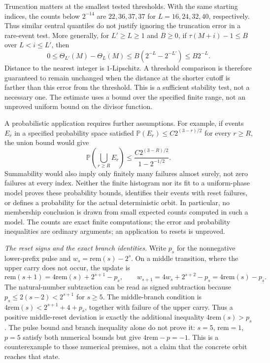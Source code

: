 Truncation matters at the smallest tested thresholds.  With the
same starting indices, the counts below $2^{-14}$ are $22,36,37,37$
for $L=16,24,32,40$, respectively.  Thus similar central quantiles
do not justify ignoring the truncation error in a rare-event test.
More generally, for $L'\ge L\ge1$ and $B\ge0$, if
$\tau(M+i)-1\le B$ over $L<i\le L'$, then
\[
 0\le\Theta_{L'}(M)-\Theta_L(M)
 \le B(2^{-L}-2^{-L'})\le B2^{-L}.
\]
Distance to the nearest integer is $1$-Lipschitz.  A threshold
comparison is therefore guaranteed to remain unchanged when
the distance at the shorter cutoff is farther than this error
from the threshold.  This is a sufficient stability test, not a
necessary one.
The estimate uses a bound over the specified finite range, not an
unproved uniform bound on the divisor function.

A probabilistic application requires further assumptions.  For
example, if events $E_r$ in a specified probability space satisfied
$\mathbb P(E_r)\le C2^{(3-r)/2}$ for every $r\ge R$, the union
bound would give
\[
 \mathbb P\left(\bigcup_{r\ge R}E_r\right)
 \le \frac{C2^{(3-R)/2}}{1-2^{-1/2}}.
\]
Summability would also imply only finitely many failures almost
surely, not zero failures at every index.  Neither the finite
histogram nor its fit to a uniform-phase model proves these
probability bounds, identifies their events with reset failures,
or defines a probability for the actual deterministic orbit.
In particular, no membership conclusion is drawn from small
expected counts computed in such a model.  The counts are
exact finite computations; the error and probability inequalities are
ordinary arguments; an application to resets is unproved.

\emph{The reset signs and the exact branch identities.}
Write $p_s$ for the nonnegative lower-prefix pulse and
$w_s=\mathrm{rem}(s)-2^s$.  On a middle transition, where the upper
carry does not occur, the update is
\[
 \mathrm{rem}(s+1)=4\mathrm{rem}(s)+2^{s+1}-p_s,
 \qquad
 w_{s+1}=4w_s+2^{s+2}-p_s=4\mathrm{rem}(s)-p_s.
\]
The natural-number subtraction can be read as signed subtraction
because $p_s\le2(s-2)<2^{s+1}$ for $s\ge5$.
The middle-branch condition is
$4\mathrm{rem}(s)<2^{s+1}+4+p_s$, together with failure of the
upper carry.  Thus a positive middle-reset deviation is exactly the
additional inequality $4\mathrm{rem}(s)>p_s$.
The pulse bound and branch inequality alone do not prove it:
$s=5$, $\mathrm{rem}=1$, $p=5$ satisfy both numerical bounds but give
$4\mathrm{rem}-p=-1$.  This is a counterexample to those numerical
premises, not a claim that the concrete orbit reaches that state.

